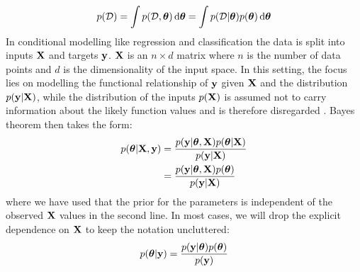 \documentclass[../thesis.tex]{subfiles}
\begin{document}
\begin{equation}
    \begin{split}
        p(\mathcal{D}) = \int p(\mathcal{D}, \boldsymbol{\mathbf{\theta}}) \mathop{}\!\mathrm{d} \boldsymbol{\mathbf{\theta}} = \int p(\mathcal{D} | \boldsymbol{\mathbf{\theta}}) p(\boldsymbol{\mathbf{\theta}}) \mathop{}\!\mathrm{d} \boldsymbol{\mathbf{\theta}}
    \end{split}
\end{equation}
In conditional modelling like regression and classification the data is split into inputs $\boldsymbol{\mathbf{X}}$ and targets $\boldsymbol{\mathbf{y}}$. $\boldsymbol{\mathbf{X}}$ is an $n \times d$ matrix where $n$ is the number of data points and $d$ is the dimensionality of the input space. In this setting, the focus lies on modelling the functional relationship of $\boldsymbol{\mathbf{y}}$ given $\boldsymbol{\mathbf{X}}$ and the distribution $p(\boldsymbol{\mathbf{y}} | \boldsymbol{\mathbf{X}})$, while the distribution of the inputs $p(\boldsymbol{\mathbf{X}})$ is assumed not to carry information about the likely function values and is therefore disregarded \parencite[Chapter~14.1]{gelman2014bayesian}. Bayes theorem then takes the form:
\begin{equation}
    \begin{split}
        p(\boldsymbol{\mathbf{\theta}} | \boldsymbol{\mathbf{X}}, \boldsymbol{\mathbf{y}}) &= \frac{p(\boldsymbol{\mathbf{y}} | \boldsymbol{\mathbf{\theta}}, \boldsymbol{\mathbf{X}}) p(\boldsymbol{\mathbf{\theta}} | \boldsymbol{\mathbf{X}})}  {p(\boldsymbol{\mathbf{y}} | \boldsymbol{\mathbf{X}})} \\
        &= \frac{p(\boldsymbol{\mathbf{y}} | \boldsymbol{\mathbf{\theta}}, \boldsymbol{\mathbf{X}}) p(\boldsymbol{\mathbf{\theta}})}  {p(\boldsymbol{\mathbf{y}} | \boldsymbol{\mathbf{X}})}
    \end{split}
\end{equation}
where we have used that the prior for the parameters is independent of the observed $\boldsymbol{\mathbf{X}}$ values in the second line. In most cases, we will drop the explicit dependence on $\boldsymbol{\mathbf{X}}$ to keep the notation uncluttered:
\begin{equation}
    \begin{split}
        p(\boldsymbol{\mathbf{\theta}} | \boldsymbol{\mathbf{y}}) = \frac{p(\boldsymbol{\mathbf{y}} | \boldsymbol{\mathbf{\theta}}) p(\boldsymbol{\mathbf{\theta}})}  {p(\boldsymbol{\mathbf{y}})}
    \end{split}
\end{equation}
\end{document}

